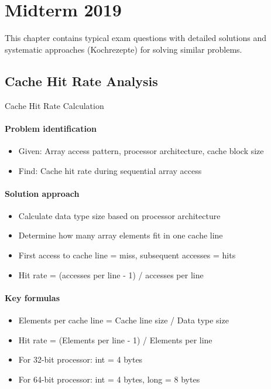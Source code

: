 \section{Midterm 2019}

This chapter contains typical exam questions with detailed solutions and systematic approaches (Kochrezepte) for solving similar problems.

\subsection{Cache Hit Rate Analysis}

\begin{KR}{Cache Hit Rate Calculation}
    \paragraph{Problem identification}
    \begin{itemize}
        \item Given: Array access pattern, processor architecture, cache block size
        \item Find: Cache hit rate during sequential array access
    \end{itemize}
    
    \paragraph{Solution approach}
    \begin{itemize}
        \item Calculate data type size based on processor architecture
        \item Determine how many array elements fit in one cache line
        \item First access to cache line = miss, subsequent accesses = hits
        \item Hit rate = (accesses per line - 1) / accesses per line
    \end{itemize}
    
    \paragraph{Key formulas}
    \begin{itemize}
        \item Elements per cache line = Cache line size / Data type size
        \item Hit rate = (Elements per line - 1) / Elements per line
        \item For 32-bit processor: int = 4 bytes
        \item For 64-bit processor: int = 4 bytes, long = 8 bytes
    \end{itemize}
\end{KR}

